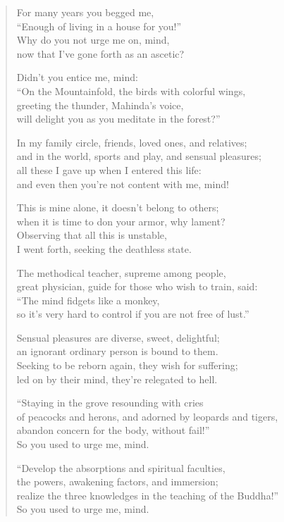 \documentclass[12pt,openany]{book}%
\begin{document}
\begin{verse}
For many years you begged me, \\
“Enough of living in a house for you!” \\
Why do you not urge me on, mind, \\
now that I’ve gone forth as an ascetic? 

Didn’t you entice me, mind: \\
“On the Mountainfold, the birds with colorful wings, \\
greeting the thunder, Mahinda’s voice, \\
will delight you as you meditate in the forest?” 

In my family circle, friends, loved ones, and relatives; \\
and in the world, sports and play, and sensual pleasures; \\
all these I gave up when I entered this life: \\
and even then you’re not content with me, mind! 

This is mine alone, it doesn’t belong to others; \\
when it is time to don your armor, why lament? \\
Observing that all this is unstable, \\
I went forth, seeking the deathless state. 

The methodical teacher, supreme among people, \\
great physician, guide for those who wish to train, said: \\
“The mind fidgets like a monkey, \\
so it’s very hard to control if you are not free of lust.” 

Sensual pleasures are diverse, sweet, delightful; \\
an ignorant ordinary person is bound to them. \\
Seeking to be reborn again, they wish for suffering; \\
led on by their mind, they’re relegated to hell. 

“Staying in the grove resounding with cries \\
of peacocks and herons, and adorned by leopards and tigers, \\
abandon concern for the body, without fail!” \\
So you used to urge me, mind. 

“Develop the absorptions and spiritual faculties, \\
the powers, awakening factors, and immersion; \\
realize the three knowledges in the teaching of the Buddha!” \\
So you used to urge me, mind. 


\end{verse}
\end{document}
